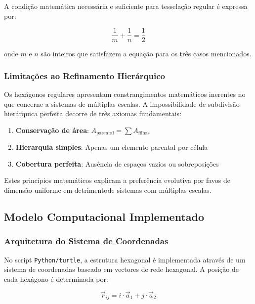 \documentclass[12pt,a4paper,oneside]{extarticle}
\begin{document}
A condição matemática necessária e suficiente para tesselação regular é expressa por:

\begin{equation}
\frac{1}{m} + \frac{1}{n} = \frac{1}{2}
\label{eq:tessellation_condition}
\end{equation}

onde $m$ e $n$ são inteiros que satisfazem a equação para os três casos mencionados.

\subsubsection{Limitações ao Refinamento Hierárquico}
Os hexágonos regulares apresentam constrangimentos matemáticos inerentes no que concerne a sistemas de múltiplas escalas. A impossibilidade de subdivisão hierárquica perfeita decorre de três axiomas fundamentais:

\begin{enumerate}
    \item \textbf{Conservação de área}: $A_{\text{parental}} = \sum A_{\text{filhas}}$
    \item \textbf{Hierarquia simples}: Apenas um elemento parental por célula
    \item \textbf{Cobertura perfeita}: Ausência de espaços vazios ou sobreposições
\end{enumerate}

Estes princípios matemáticos explicam a preferência evolutiva por favos de dimensão uniforme em detrimentode sistemas com múltiplas escalas.

\subsection{Modelo Computacional Implementado}



\subsubsection{Arquitetura do Sistema de Coordenadas}
No script \texttt{Python/turtle}, a estrutura hexagonal é implementada através de um sistema de coordenadas baseado em vectores de rede hexagonal. A posição de cada hexágono é determinada por:

\begin{equation}
\vec{r}_{ij} = i \cdot \vec{a}_1 + j \cdot \vec{a}_2
\label{eq:hexagonal_grid}
\end{equation}
\end{document}
